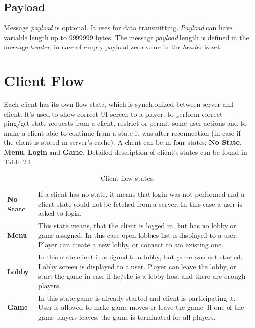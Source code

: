 \documentclass[english, sem, kiv, he, iso690alph, pdf, viewonly]{fasthesis}
\begin{document}
\section{Payload}

Message \textit{payload} is optional. It uses  for data transmitting. \textit{Payload} can have variable length up to 9999999 bytes. The message \textit{payload} length is defined in the message \textit{header}, in case of empty payload zero value in the \textit{header} is set.

\chapter{Client Flow}

Each client has its own flow state, which is synchronized between server and client. It's used to show correct \ac{UI} screen to a player, to perform correct ping/get-state requests from a client, restrict or permit some user actions and to make a client able to continue from a state it was after reconnection (in case if the client is stored in server's cache). A client can be in four states: \textbf{No State}, \textbf{Menu}, \textbf{Login} and \textbf{Game}. Detailed description of client's states can be found in Table \ref{tab:client_flow_states}

\begin{table}[h]
	\centering
	\begin{tabular}{lp{325pt}}
	
		\textbf{No State} & If a client has no state, it means that login was not performed and a client state could not be fetched from a server. In this case a user is asked to login. \newline \\

		\textbf{Menu} & This state means, that the client is logged in, but has no lobby or game assigned. In this case open lobbies list is displayed to a user. Player can create a new lobby, or connect to am existing one. \newline \\

		\textbf{Lobby} & In this state client is assigned to a lobby, but game was not started. Lobby screen is displayed to a user. Player can leave the lobby, or start the game in case if he/she is a lobby host and there are enough players. \newline \\

		\textbf{Game} & In this state game is already started and client is participating it. User is allowed to make game moves or leave the game. If one of the game players leaves, the game is terminated for all players.

	\end{tabular}
	\caption{Client flow states.}
	\label{tab:client_flow_states}
\end{table}
\end{document}
